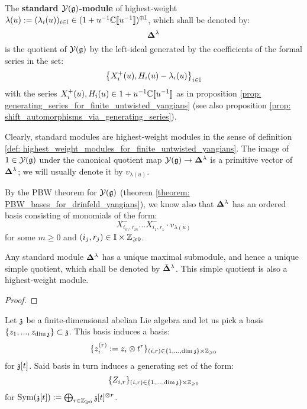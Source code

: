         \begin{definition} \label{def: standard_modules_for_finite_untwisted_yangians}
            The \textbf{standard $\mathcal{Y}(\mathfrak{g})$-module} of highest-weight $\lambda(u) := ( \lambda_i(u) )_{i \in \mathbb{I}} \in (1 + u^{-1} \mathbb{C}[\![u^{-1}]\!])^{\oplus \mathbb{I}}$, which shall be denoted by:
                $$\mathbf{ \Delta }^{\lambda}$$
            is the quotient of $\mathcal{Y}(\mathfrak{g})$ by the left-ideal generated by the coefficients of the formal series in the set:
                $$\left\{ X_i^+(u), H_i(u) - \lambda_i(u) \right\}_{i \in \mathbb{I}}$$
            with the series $X_i^+(u), H_i(u) \in 1 + u^{-1} \mathbb{C}[\![u^{-1}]\!]$ as in proposition \ref{prop: generating_series_for_finite_untwisted_yangians} (see also proposition \ref{prop: shift_automorphisms_via_generating_series}).
        \end{definition}
        Clearly, standard modules are highest-weight modules in the sense of definition \ref{def: highest_weight_modules_for_finite_untwisted_yangians}. The image of $1 \in \mathcal{Y}(\mathfrak{g})$ under the canonical quotient map $\mathcal{Y}(\mathfrak{g}) \to \mathbf{ \Delta }^{\lambda}$ is a primitive vector of $\mathbf{ \Delta }^{\lambda}$; we will usually denote it by $v_{\lambda(u)}$.

        By the PBW theorem for $\mathcal{Y}(\mathfrak{g})$ (theorem \ref{theorem: PBW_bases_for_drinfeld_yangians}), we know also that $\mathbf{ \Delta }^{\lambda}$ has an ordered basis consisting of monomials of the form:
            $$X^-_{i_m, r_m} ... X^-_{i_1, r_1} \cdot v_{\lambda(u)}$$
        for some $m \geq 0$ and $(i_j, r_j) \in \simpleroots \x \Z_{\geq 0}$.

        \begin{lemma} \label{lemma: unqiue_simple_quotients_of_finite_untwisted_yangian_standard_modules}
            Any standard module $\mathbf{ \Delta }^{\lambda}$ has a unique maximal submodule, and hence a unique simple quotient, which shall be denoted by $\bar{ \mathbf{ \Delta } }^{\lambda}$. This simple quotient is also a highest-weight module.
        \end{lemma}
            \begin{proof}
                
            \end{proof}

        Let $\mathfrak{z}$ be a finite-dimensional abelian Lie algebra and let us pick a basis $\{z_1, ..., z_{\dim \mathfrak{z}}\} \subset \mathfrak{z}$. This basis induces a basis:
            $$\{ z_i^{(r)} := z_i \tensor t^r \}_{(i, r) \in \{1, ..., \dim \z\} \x \Z_{\geq 0}}$$
        for $\mathfrak{z}[t]$. Said basis in turn induces a generating set of the form:
            $$\{ Z_{i, r} \}_{(i, r) \in \{1, ..., \dim \z\} \x \Z_{\geq 0}}$$
        for $\Sym(\z[t]) := \bigoplus_{r \in \Z_{\geq 0}} \z[t]^{\tensor r}$.
        
